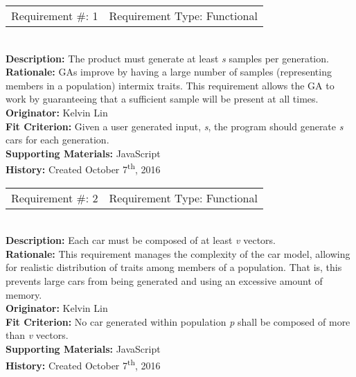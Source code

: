 \documentclass[12pt, titlepage]{article}
\begin{document}
\begin{reqbox}
%
\begin{tabular}{cc}
Requirement \#: 1 & Requirement Type: Functional \\
\end{tabular} \\
%
\textbf{Description:} The product must generate at least \textit{s} samples per generation. \\
\textbf{Rationale:}  GAs improve by having a large number of samples (representing members in a population) intermix traits. This requirement allows the GA to work by guaranteeing that a sufficient sample will be present at all times.\\
\textbf{Originator:} Kelvin Lin\\
\textbf{Fit Criterion:} Given a user generated input, \textit{s}, the program should generate \textit{s} cars for each generation.\\
%  
\textbf{Supporting Materials:} JavaScript \\
\textbf{History:} Created October 7\textsuperscript{th}, 2016
%
\end{reqbox}

\begin{reqbox}
%
\begin{tabular}{cc}
Requirement \#: 2 & Requirement Type: Functional \\
\end{tabular} \\
%
\textbf{Description:} Each car must be composed of at least \textit{v} vectors. \\
\textbf{Rationale:}  This requirement manages the complexity of the car model, allowing for realistic distribution of traits among members of a population. That is, this prevents large cars from being generated and using an excessive amount of memory. \\
\textbf{Originator:} Kelvin Lin\\
\textbf{Fit Criterion:} No car generated within population \textit{p} shall be composed of more than \textit{v} vectors.\\
%  
\textbf{Supporting Materials:} JavaScript \\
\textbf{History:} Created October 7\textsuperscript{th}, 2016
%
\end{reqbox}

\newpage
\end{document}
